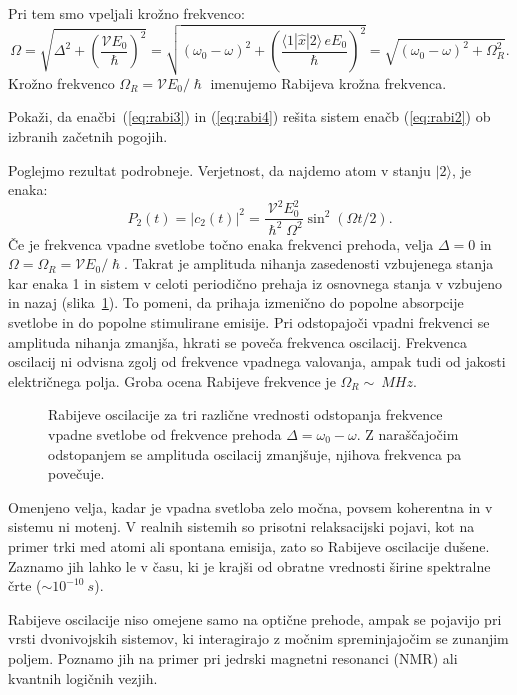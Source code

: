 Pri tem smo vpeljali krožno frekvenco:
\begin{equation}
\Omega = \sqrt{\Delta^2 + \left(\frac{\mathcal{V}E_0}{\hslash}\right)^2} = \sqrt{(\omega_0-\omega)^2 
+ \left(\frac{\langle1|\hat{x}|2\rangle\, eE_0}{\hslash}\right)^2} = 
\sqrt{(\omega_0-\omega)^2 + \Omega_R^2}.
\end{equation}
Krožno frekvenco $\Omega_R = \mathcal{V} E_0/\hslash$ imenujemo Rabijeva krožna frekvenca.

\begin{naloga}
Pokaži, da enačbi~(\ref{eq:rabi3}) in (\ref{eq:rabi4}) rešita
sistem enačb (\ref{eq:rabi2}) ob izbranih začetnih pogojih.
\end{naloga}
Poglejmo rezultat podrobneje. Verjetnost, da najdemo atom v stanju $|2\rangle$, je enaka:
\begin{equation}
P_2(t) = |c_2(t)|^2 = \frac{\mathcal{V}^2E_0^2}{\hslash^2 \Omega^2}\sin^2(\Omega t/2).
\end{equation}
Če je frekvenca vpadne svetlobe točno enaka frekvenci prehoda, velja $\Delta = 0$ in 
$\Omega = \Omega_R = \mathcal{V}E_0/\hslash$. Takrat je amplituda nihanja zasedenosti vzbujenega stanja kar enaka 1
in sistem v celoti periodično prehaja iz osnovnega stanja v vzbujeno in nazaj (slika~\ref{fig:Rabi}). To pomeni,
da prihaja izmenično do popolne absorpcije svetlobe in do popolne stimulirane emisije.
Pri odstopajoči vpadni frekvenci se amplituda nihanja zmanjša, hkrati se poveča
frekvenca oscilacij. Frekvenca oscilacij ni odvisna zgolj od frekvence vpadnega valovanja, 
ampak tudi od jakosti električnega polja. Groba ocena
Rabijeve frekvence je $\Omega_R \sim~\si{MHz}$.
\begin{figure}[ht]
\centering
\def\svgwidth{90truemm} 

\caption{Rabijeve oscilacije za tri različne vrednosti odstopanja frekvence vpadne
svetlobe od frekvence prehoda $\Delta=\omega_0-\omega$. 
Z naraščajočim odstopanjem se amplituda oscilacij
zmanjšuje, njihova frekvenca pa povečuje.}
\label{fig:Rabi}
\end{figure}

Omenjeno velja, kadar je vpadna svetloba zelo močna, povsem koherentna in v sistemu ni 
motenj. V realnih sistemih so prisotni relaksacijski pojavi, kot na primer trki med atomi
ali spontana emisija, zato so Rabijeve oscilacije dušene. Zaznamo jih lahko le v času, ki 
je krajši od obratne vrednosti širine spektralne črte ($\sim 10^{-10}~\si{s}$).

\begin{remark}
Rabijeve oscilacije niso omejene samo na optične prehode, ampak se pojavijo pri 
vrsti dvonivojskih sistemov, ki interagirajo z močnim spreminjajočim se zunanjim poljem. 
Poznamo jih na primer pri jedrski magnetni resonanci (NMR) ali kvantnih logičnih vezjih.
\end{remark}
